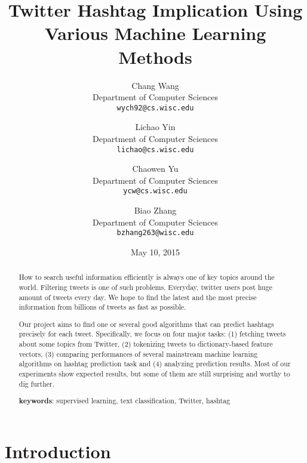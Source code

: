 \documentclass[letterpaper,11pt,twocolumn]{article}
\title{\bf{Twitter Hashtag Implication Using Various Machine Learning Methods}}
\author{
  Chang Wang\\
  Department of Computer Sciences\\
  \texttt{wych92@cs.wisc.edu}
  \and
  Lichao Yin\\
  Department of Computer Sciences\\
  \texttt{lichao@cs.wisc.edu}
  \and
  Chaowen Yu\\
  Department of Computer Sciences\\
  \texttt{ycw@cs.wisc.edu}
  \and
  Biao Zhang\\
  Department of Computer Sciences\\
  \texttt{bzhang263@wisc.edu}
}
\date{May 10, 2015}
\begin{document}
\twocolumn[
\maketitle
]
\begin{abstract}
How to search useful information efficiently is always one of key topics around the world. Filtering tweets is one of such problems. Everyday, twitter users post huge amount of tweets every day. We hope to find the latest and the most precise information from billions of tweets as fast as possible.

Our project aims to find one or several good algorithms that can predict hashtags precisely for each tweet. Specifically, we focus on four major tasks: (1) fetching tweets about some topics from Twitter, (2) tokenizing tweets to dictionary-based feature vectors, (3) comparing performances of several mainstream machine learning algorithms on hashtag prediction task and (4) analyzing prediction results. Most of our experiments show expected results, but some of them are still surprising and worthy to dig further.


\textbf{keywords}: supervised learning, text classification, Twitter, hashtag
\end{abstract}

\section{Introduction}
\label{sec:intro}
\end{document}
